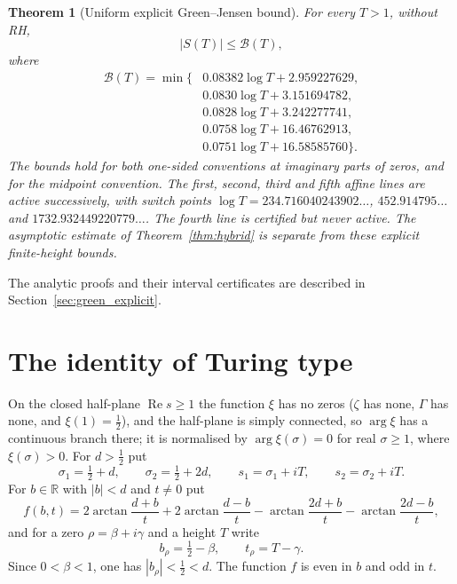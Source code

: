 \documentclass[11pt,reqno]{amsart}
\numberwithin{equation}{section}
\newtheorem{theorem}{Theorem}[section]
\theoremstyle{definition}
\theoremstyle{remark}
\newcommand{\R}{\mathbb R}
\newcommand{\Rp}{\operatorname{Re}}
\begin{document}
\begin{theorem}[Uniform explicit Green--Jensen bound]
\label{thm:green_explicit}
For every $T>1$, without RH,
\begin{equation}
\boxed{\displaystyle |S(T)|\le\mathcal B(T),}
\label{eq:green_explicit}
\end{equation}
where
\begin{equation}
\begin{aligned}
\mathcal B(T)=\min\{&
0.08382\log T+2.959227629,\\
&0.0830\log T+3.151694782,\\
&0.0828\log T+3.242277741,\\
&0.0758\log T+16.46762913,\\
&0.0751\log T+16.58585760\}.
\end{aligned}
\label{eq:green_bound}
\end{equation}
The bounds hold for both one-sided conventions
at imaginary parts of zeros, and for the midpoint convention.
The first, second, third and fifth affine lines are
active successively, with switch points
$\log T=234.716040243902\ldots$,
$452.914795\ldots$ and
$1732.932449220779\ldots$.
The fourth line is certified but never active.
The asymptotic estimate of Theorem~\ref{thm:hybrid}
is separate from these explicit finite-height bounds.
\end{theorem}
The analytic proofs and their interval certificates
are described in Section~\ref{sec:green_explicit}.

\section{The identity of Turing type}\label{sec:identity}

On the closed half-plane $\Rp s\ge1$ the function $\xi$ has no zeros ($\zeta$ has none, $\Gamma$ has none, and $\xi(1)=\frac12$), and the half-plane is simply connected, so $\arg\xi$ has a continuous branch there; it is normalised by $\arg\xi(\sigma)=0$ for real $\sigma\ge1$, where $\xi(\sigma)>0$. For $d>\frac12$ put
\begin{equation}
\sigma_1=\tfrac12+d,\qquad\sigma_2=\tfrac12+2d,\qquad s_1=\sigma_1+iT,\qquad s_2=\sigma_2+iT .
\label{eq:sigma12}
\end{equation}
For $b\in\R$ with $|b|<d$ and $t\ne0$ put
\begin{equation}
f(b,t)=2\arctan\frac{d+b}t+2\arctan\frac{d-b}t-\arctan\frac{2d+b}t-\arctan\frac{2d-b}t,
\label{eq:f_def}
\end{equation}
and for a zero $\rho=\beta+i\gamma$ and a height $T$ write
\begin{equation}
b_\rho=\tfrac12-\beta,\qquad t_\rho=T-\gamma .
\label{eq:b_t_rho}
\end{equation}
Since $0<\beta<1$, one has $|b_\rho|<\frac12<d$. The function $f$ is even in $b$ and odd in $t$.
\end{document}
